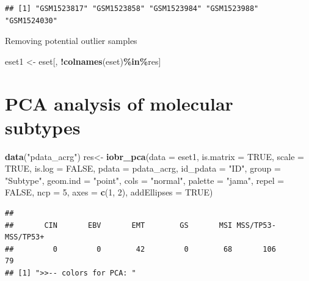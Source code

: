 \documentclass[
  12pt,
]{book}
\newenvironment{Shaded}{\begin{snugshade}}{\end{snugshade}}
\newcommand{\AttributeTok}[1]{\textcolor[rgb]{0.13,0.29,0.53}{#1}}
\newcommand{\ConstantTok}[1]{\textcolor[rgb]{0.56,0.35,0.01}{#1}}
\newcommand{\DecValTok}[1]{\textcolor[rgb]{0.00,0.00,0.81}{#1}}
\newcommand{\FunctionTok}[1]{\textcolor[rgb]{0.13,0.29,0.53}{\textbf{#1}}}
\newcommand{\NormalTok}[1]{#1}
\newcommand{\OtherTok}[1]{\textcolor[rgb]{0.56,0.35,0.01}{#1}}
\newcommand{\SpecialCharTok}[1]{\textcolor[rgb]{0.81,0.36,0.00}{\textbf{#1}}}
\newcommand{\StringTok}[1]{\textcolor[rgb]{0.31,0.60,0.02}{#1}}
\begin{document}
\begin{verbatim}
## [1] "GSM1523817" "GSM1523858" "GSM1523984" "GSM1523988" "GSM1524030"
\end{verbatim}

Removing potential outlier samples

\begin{Shaded}
\begin{Highlighting}[]
\NormalTok{eset1 }\OtherTok{\textless{}{-}}\NormalTok{ eset[, }\SpecialCharTok{!}\FunctionTok{colnames}\NormalTok{(eset)}\SpecialCharTok{\%in\%}\NormalTok{res]}
\end{Highlighting}
\end{Shaded}

\hypertarget{pca-analysis-of-molecular-subtypes}{%
\section{PCA analysis of molecular subtypes}\label{pca-analysis-of-molecular-subtypes}}

\begin{Shaded}
\begin{Highlighting}[]
\FunctionTok{data}\NormalTok{(}\StringTok{"pdata\_acrg"}\NormalTok{)}
\NormalTok{res}\OtherTok{\textless{}{-}} \FunctionTok{iobr\_pca}\NormalTok{(}\AttributeTok{data       =}\NormalTok{ eset1,}
              \AttributeTok{is.matrix   =} \ConstantTok{TRUE}\NormalTok{,}
              \AttributeTok{scale       =} \ConstantTok{TRUE}\NormalTok{,}
              \AttributeTok{is.log      =} \ConstantTok{FALSE}\NormalTok{,}
              \AttributeTok{pdata       =}\NormalTok{ pdata\_acrg, }
              \AttributeTok{id\_pdata    =} \StringTok{"ID"}\NormalTok{, }
              \AttributeTok{group       =} \StringTok{"Subtype"}\NormalTok{,}
              \AttributeTok{geom.ind    =} \StringTok{"point"}\NormalTok{, }
              \AttributeTok{cols        =} \StringTok{"normal"}\NormalTok{,}
              \AttributeTok{palette     =} \StringTok{"jama"}\NormalTok{, }
              \AttributeTok{repel       =} \ConstantTok{FALSE}\NormalTok{,}
              \AttributeTok{ncp         =} \DecValTok{5}\NormalTok{,}
              \AttributeTok{axes        =} \FunctionTok{c}\NormalTok{(}\DecValTok{1}\NormalTok{, }\DecValTok{2}\NormalTok{),}
              \AttributeTok{addEllipses =} \ConstantTok{TRUE}\NormalTok{)}
\end{Highlighting}
\end{Shaded}

\begin{verbatim}
## 
##       CIN       EBV       EMT        GS       MSI MSS/TP53- MSS/TP53+ 
##         0         0        42         0        68       106        79 
## [1] ">>-- colors for PCA: "
\end{verbatim}
\end{document}
